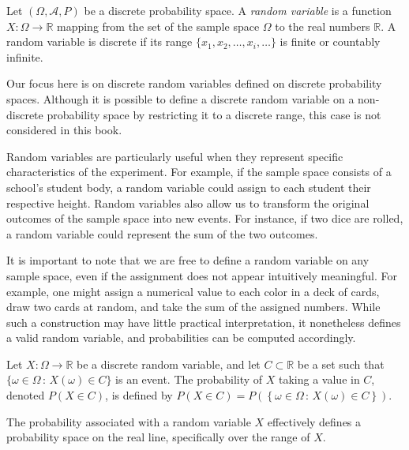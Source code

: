 \begin{definition}
Let $\left( \Omega, \mathcal{A} , P \right)$ be a discrete probability space. A \emph{random variable} is a function $X : \Omega \rightarrow \mathbb{R}$ mapping from the set of the sample space $\Omega$ to the real numbers $\mathbb{R}$. A random variable is discrete  if its range $\{ x_1, x_2, \ldots, x_i, \ldots \}$ is finite or countably infinite.
\end{definition}

Our focus here is on discrete random variables defined on discrete probability spaces. Although it is possible to define a discrete random variable on a non-discrete probability space by restricting it to a discrete range, this case is not considered in this book.

Random variables are particularly useful when they represent specific characteristics of the experiment. For example, if the sample space consists of a school's student body, a random variable could assign to each student their respective height. Random variables also allow us to transform the original outcomes of the sample space into new events. For instance, if two dice are rolled, a random variable could represent the sum of the two outcomes.

It is important to note that we are free to define a random variable on any sample space, even if the assignment does not appear intuitively meaningful. For example, one might assign a numerical value to each color in a deck of cards, draw two cards at random, and take the sum of the assigned numbers. While such a construction may have little practical interpretation, it nonetheless defines a valid random variable, and probabilities can be computed accordingly.

\begin{definition}
Let $X : \Omega \rightarrow \mathbb{R}$ be a discrete random variable, and let $C \subset \mathbb{R}$ be a set such that $\{ \omega \in \Omega \,:\, X \left( \omega \right) \in C\}$ is an event. The probability of $X$ taking a value in $C$, denoted $P(X \in C)$, is defined by $P\left( X \in C \right)=P \left( \left\{ \omega \in \Omega \,:\, X \left( \omega \right) \in C\right\} \right)$.
\end{definition}

The probability associated with a random variable $X$ effectively defines a probability space on the real line, specifically over the range of $X$.

